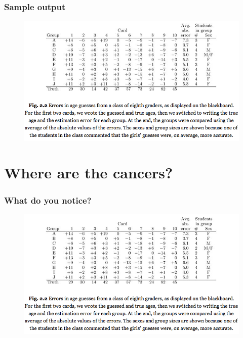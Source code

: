 \documentclass[compress,handout,10pt]{beamer}
\begin{document}
\begin{frame}
    \frametitle{Sample output}
    \vspace{7pt}
    \begin{figure}
        \begin{center}
            \includegraphics[width=\textwidth]{images/guessing-ages-error.png}
        \end{center}
    \end{figure}
\end{frame}

\section{Where are the cancers?}

\begin{frame}
    \frametitle{What do you notice?}
    \vspace{7pt}
    \begin{figure}
        \begin{center}
            \includegraphics[width=\textwidth]{images/guessing-ages-error.png}
        \end{center}
    \end{figure}
\end{frame}
\end{document}
